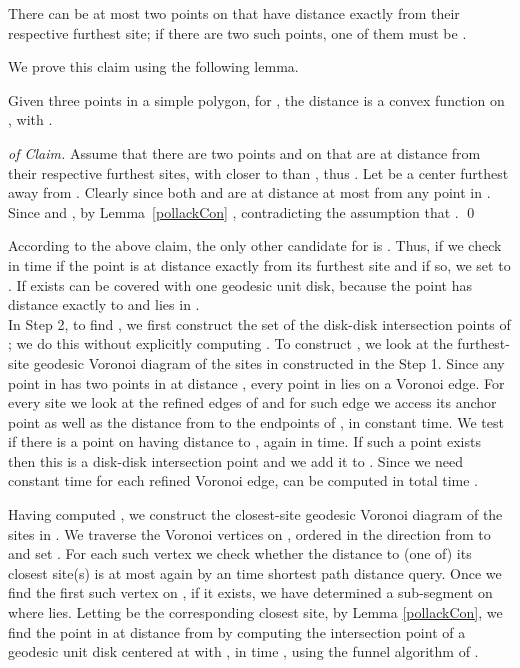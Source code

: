 \documentclass{llncs}
\begin{document}
\vspace{-9pt}
\begin{claim}There can be at most two points on  that have distance exactly  from their respective furthest site; if there are two such points, one of them must be .  
\label{claim}
\end{claim}
\vspace{-3pt}

We prove this claim using the following lemma.
\begin{lemma}
Given three points  in a simple polygon, for , the distance  is a convex function on , with  .
\label{pollackCon}
\end{lemma}





\begin{proof} [of Claim]
Assume that there are two points  and  on  that are at distance  from their respective furthest sites, with  closer to  than , thus .  Let  be a center furthest away from . Clearly  since both  and  are at distance at most  from any point in . Since  and , by Lemma~\ref{pollackCon} , contradicting the assumption that . \qed
\end{proof}


According to the above claim, the only other candidate for  is . 
Thus, if  we check in  time if the point  is at distance exactly  from its furthest site and if so, we set  to . If  exists  can be covered with one geodesic unit disk, because the point  has distance exactly  to  and lies in .   \\

In Step 2, to find , we first construct the set  of the disk-disk intersection points of ; we do this without explicitly computing . To construct , we look at the furthest-site geodesic Voronoi diagram of the sites  in  constructed in the Step 1. Since any point in  has two points in  at distance , every point in  lies on a Voronoi edge. For every site  we look at the refined edges of  and for such edge  we access its anchor point  as well as the distance from  to the endpoints of , in constant time. We test if there is a point on  having distance  to , again in  time. If such a point exists then this is a disk-disk intersection point and we add it to . Since we need constant time for each refined Voronoi edge,  can be computed in total time .

Having computed , we construct the closest-site geodesic Voronoi diagram of the sites    in . We traverse the Voronoi vertices  on , ordered in the direction from   to  and set . For each such vertex we check whether the distance to (one of) its closest site(s) is at most  again by an  time shortest path distance query. Once we find the first such vertex  on , if it exists, we have determined a sub-segment  on  where  lies. Letting  be the corresponding closest site, by Lemma  \ref{pollackCon}, we find the point in   at distance  from  by computing the intersection point of a geodesic unit disk centered at  with , in time , using the funnel algorithm of \cite{lineshortpath}.
\end{document}

